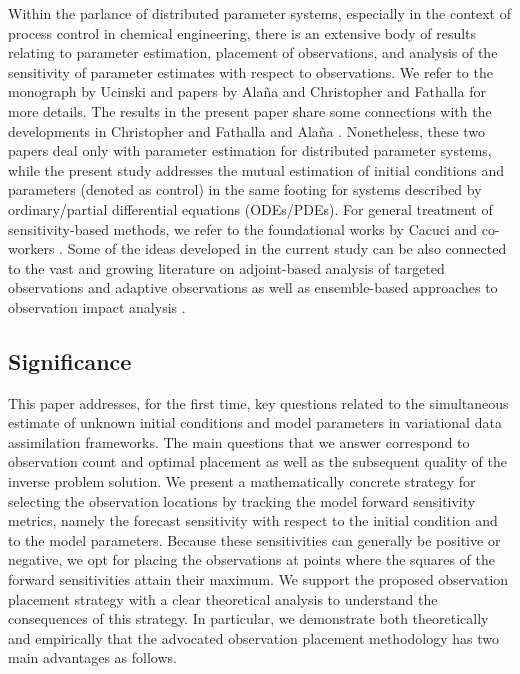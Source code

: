 \documentclass{article}
\begin{document}
Within the parlance of distributed parameter systems, especially in the context of process control in chemical engineering, there is an extensive body of results relating to parameter estimation, placement of observations, and analysis of the sensitivity of parameter estimates with respect to observations. We refer to the monograph by Ucinski \cite{ucinski2004optimal} and papers by Ala{\~n}a \cite{alana2010optimal} and Christopher and Fathalla \cite{christopher1999sensitivity} for more details. The results in the present paper share some connections with the developments in Christopher and Fathalla \cite{christopher1999sensitivity} and Ala{\~n}a \cite{alana2010optimal}. Nonetheless, these two papers deal only with parameter estimation for distributed parameter systems, while the present study addresses the mutual estimation of initial conditions and parameters (denoted as control) in the same footing for systems described by ordinary/partial differential equations (ODEs/PDEs). For general treatment of sensitivity-based methods, we refer to the foundational works by Cacuci and co-workers \cite{cacuci2003sensitivity,cacuci2005sensitivity}. Some of the ideas developed in the current study can be also connected to the vast and growing literature on adjoint-based analysis of targeted observations and adaptive observations \cite{baker2000observation,langland2004estimation,daescu2008sensitivity,cardinali2009monitoring,gelaro2009examination,majumdar2016review} as well as ensemble-based approaches to observation impact analysis \cite{ancell2007comparing,liu2008estimating}.

\subsection{Significance}
This paper addresses, for the first time, key questions related to the simultaneous estimate of unknown initial conditions and model parameters in variational data assimilation frameworks. The main questions that we answer correspond to observation count and optimal placement as well as the subsequent quality of the inverse problem solution. We present a mathematically concrete strategy for selecting the observation locations by tracking the model forward sensitivity metrics, namely the forecast sensitivity with respect to the initial condition and to the model parameters. Because these sensitivities can generally be positive or negative, we opt for placing the observations at points where the squares of the forward sensitivities attain their maximum. We support the proposed observation placement strategy with a clear theoretical analysis to understand the consequences of this strategy. \textcolor{rev}{In particular, we demonstrate both theoretically and empirically that the advocated observation placement methodology has two main advantages as follows.}
\end{document}

